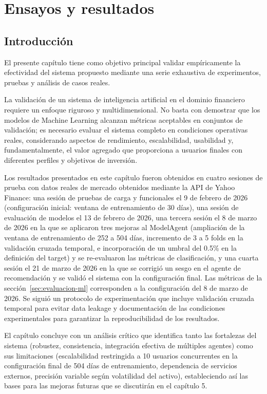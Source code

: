 
\chapter{Ensayos y resultados}

\section*{Introducción}

 El presente capítulo tiene como objetivo principal validar empíricamente la efectividad del sistema propuesto mediante una serie exhaustiva de experimentos, pruebas y análisis de casos reales.

La validación de un sistema de inteligencia artificial en el dominio financiero requiere un enfoque riguroso y multidimensional. No basta con demostrar que los modelos de Machine Learning alcanzan métricas aceptables en conjuntos de validación; es necesario evaluar el sistema completo en condiciones operativas reales, considerando aspectos de rendimiento, escalabilidad, usabilidad y, fundamentalmente, el valor agregado que proporciona a usuarios finales con diferentes perfiles y objetivos de inversión.

Los resultados presentados en este capítulo fueron obtenidos en cuatro sesiones de prueba con
  datos reales de mercado obtenidos mediante la API de Yahoo Finance: una sesión de pruebas de
  carga y funcionales el 9 de febrero de 2026 (configuración inicial: ventana de entrenamiento
  de 30 días), una sesión de evaluación de modelos el 13 de febrero de 2026, una tercera sesión
  el 8 de marzo de 2026 en la que se aplicaron tres mejoras al ModelAgent (ampliación de la
  ventana de entrenamiento de 252 a 504 días, incremento de 3 a 5 folds en la validación
  cruzada temporal, e incorporación de un umbral del 0.5\% en la definición del target) y se
  re-evaluaron las métricas de clasificación, y una cuarta sesión el 21 de marzo de 2026 en la
  que se corrigió un sesgo en el agente de recomendación y se validó el sistema con la
  configuración final. Las métricas de la sección~\ref{sec:evaluacion-ml} corresponden a la
  configuración del 8 de marzo de 2026. Se siguió un protocolo de experimentación que incluye
  validación cruzada temporal para evitar data leakage y documentación de las condiciones
  experimentales para garantizar la reproducibilidad de los resultados.


El capítulo concluye con un análisis crítico que identifica tanto las fortalezas del sistema (robustez, consistencia, integración efectiva de múltiples agentes) como sus limitaciones (escalabilidad restringida a 10 usuarios concurrentes en la configuración final de 504 días de entrenamiento, dependencia de servicios externos, precisión variable según volatilidad del activo), estableciendo así las bases para las mejoras futuras que se discutirán en el capítulo 5.

